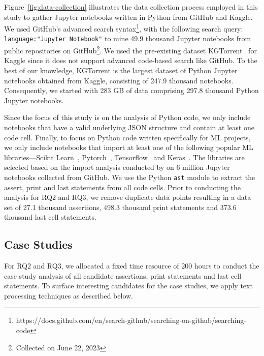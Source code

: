\documentclass[smallextended]{svjour3}       %
\begin{document}
Figure~\ref{fig:data-collection} illustrates the data collection process employed in this study to gather Jupyter notebooks written in Python from GitHub and Kaggle. We used GitHub's advanced search syntax\footnote{https://docs.github.com/en/search-github/searching-on-github/searching-code}, with the following search query: \lstinline[language={}]$language:"Jupyter Notebook"$ to mine 49.9 thousand Jupyter notebooks from public repositories on GitHub\footnote{Collected on June 22, 2023}. We used the pre-existing dataset KGTorrent~\citep{quaranta2021kgtorrent} for Kaggle since it does not support advanced code-based search like GitHub. To the best of our knowledge, KGTorrent is the largest dataset of Python Jupyter notebooks obtained from Kaggle, consisting of 247.9 thousand notebooks. Consequently, we started with 283 GB of data comprising 297.8 thousand Python Jupyter notebooks.

Since the focus of this study is on the analysis of Python code, we only include notebooks that have a valid underlying JSON structure and contain at least one code cell. Finally, to focus on Python code written specifically for ML projects, we only include notebooks that import at least one of the following popular ML libraries---Scikit Learn~\citep{pedregosa2011scikit-learn}, Pytorch~\citep{paszke2017automatic}, Tensorflow~\citep{abadi2015tensorflow} and Keras~\citep{chollet2015keras}. The libraries are selected based on the import analysis conducted by \citet{psallidas2019data} on 6 million Jupyter notebooks collected from GitHub. We use the Python \lstinline{ast} module to extract the assert, print and last statements from all code cells. Prior to conducting the analysis for RQ2 and RQ3, we remove duplicate data points resulting in a data set of 27.1 thousand assertions, 498.3 thousand print statements and 373.6 thousand last cell statements.

\subsection{Case Studies}

For RQ2 and RQ3, we allocated a fixed time resource of 200 hours to conduct the case study analysis of all candidate assertions, print statements and last cell statements. To surface interesting candidates for the case studies, we apply text processing techniques as described below.
\end{document}
